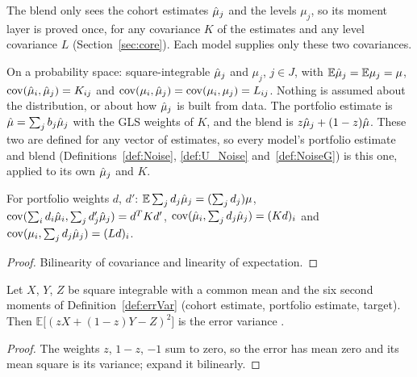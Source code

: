 The blend only sees the cohort estimates $\hat\mu_j$ and the levels $\mu_j$, so
its moment layer is proved once, for any covariance $K$ of the estimates and
any level covariance $L$ (Section~\ref{sec:core}). Each model supplies only
these two covariances.

\begin{definition}\label{def:Core_Estimates}
  \leanok
  On a probability space: square-integrable $\hat\mu_j$ and $\mu_j$, $j \in J$,
  with $\mathbb E\hat\mu_j = \mathbb E\mu_j = \mu$,
  $\operatorname{cov}(\hat\mu_i,\hat\mu_j) = K_{ij}$ and
  $\operatorname{cov}(\mu_i,\hat\mu_j) = \operatorname{cov}(\mu_i,\mu_j) = L_{ij}$. Nothing is assumed about
  the distribution, or about how $\hat\mu_j$ is built from data. The portfolio
  estimate is $\hat\mu = \sum_j b_j\hat\mu_j$ with the GLS weights of $K$, and the
  blend is $z\hat\mu_j + (1-z)\hat\mu$. These two are defined for any vector of
  estimates, so every model's portfolio estimate and blend
  (Definitions~\ref{def:Noise}, \ref{def:U_Noise} and~\ref{def:NoiseG}) is
  this one, applied to its own $\hat\mu_j$ and $K$.
\end{definition}

\begin{lemma}\label{lem:Core_moments_lin}
  \leanok
  For portfolio weights $d$, $d'$: $\mathbb E\sum_j d_j\hat\mu_j = (\sum_j d_j)\mu$,
  $\operatorname{cov}(\sum_i d_i\hat\mu_i, \sum_j d'_j\hat\mu_j) = d^TKd'$,
  $\operatorname{cov}(\hat\mu_i, \sum_j d_j\hat\mu_j) = (Kd)_i$ and
  $\operatorname{cov}(\mu_i, \sum_j d_j\hat\mu_j) = (Ld)_i$.
\end{lemma}
\begin{proof}
  \leanok
  Bilinearity of covariance and linearity of expectation.
\end{proof}

\begin{theorem}\label{thm:blend_mse}
  \leanok
  Let $X$, $Y$, $Z$ be square integrable with a common mean and the six
  second moments of Definition~\ref{def:errVar} (cohort estimate, portfolio
  estimate, target). Then
  $\mathbb E\bigl[(zX + (1-z)Y - Z)^2\bigr]$ is the error variance .
\end{theorem}
\begin{proof}
  \leanok
  The weights $z$, $1-z$, $-1$ sum to zero, so the error has mean zero and
  its mean square is its variance; expand it bilinearly.
\end{proof}

